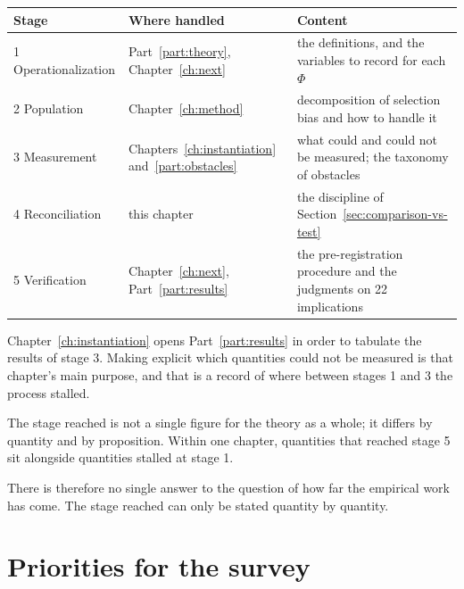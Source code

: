\begin{center}
\begin{tabularx}{\textwidth}{@{}l>{\raggedright\arraybackslash}p{}X@{}}
\toprule
Stage & Where handled & Content \\
\midrule
1 Operationalization & Part~\ref{part:theory}, Chapter~\ref{ch:next} & the definitions, and the variables to record for each $\Phi$ \\
2 Population & Chapter~\ref{ch:method} & decomposition of selection bias and how to handle it \\
3 Measurement & Chapters~\ref{ch:instantiation} and~\ref{part:obstacles} & what could and could not be measured; the taxonomy of obstacles \\
4 Reconciliation & this chapter & the discipline of Section~\ref{sec:comparison-vs-test} \\
5 Verification & Chapter~\ref{ch:next}, Part~\ref{part:results} & the pre-registration procedure and the judgments on 22 implications \\
\bottomrule
\end{tabularx}
\label{tab:stage-mapping}
\end{center}

Chapter~\ref{ch:instantiation} opens Part~\ref{part:results} in order to tabulate the results
of stage 3. Making explicit which quantities could not be measured is that chapter's main
purpose, and that is a record of where between stages 1 and 3 the process stalled.

\begin{remark}
\label{rem:stage-per-quantity}
The stage reached is not a single figure for the theory as a whole; it differs by quantity
and by proposition. Within one chapter, quantities that reached stage 5 sit alongside
quantities stalled at stage 1.

There is therefore no single answer to the question of how far the empirical work has come.
The stage reached can only be stated quantity by quantity.
\end{remark}


\label{ch:next}


\section{Priorities for the survey}

